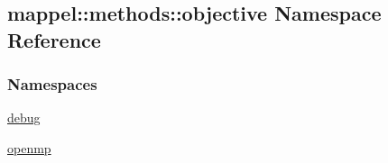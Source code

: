\hypertarget{namespacemappel_1_1methods_1_1objective}{}\subsection{mappel\+:\+:methods\+:\+:objective Namespace Reference}
\label{namespacemappel_1_1methods_1_1objective}
\subsubsection*{Namespaces}
\begin{DoxyCompactItemize}
\item 
 \hyperlink{namespacemappel_1_1methods_1_1objective_1_1debug}{debug}
\item 
 \hyperlink{namespacemappel_1_1methods_1_1objective_1_1openmp}{openmp}
\end{DoxyCompactItemize}
